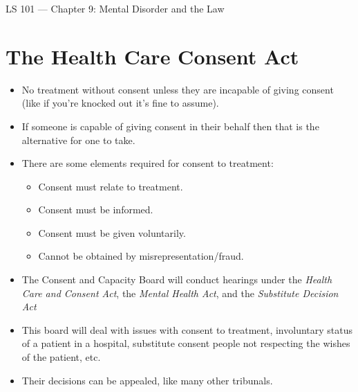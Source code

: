 \documentclass{article}
\author{Clement Tsang}
\begin{document}
\begin{center}
    \Large{LS 101 --- Chapter 9: Mental Disorder and the Law} 
\end{center}

\section{The Health Care Consent Act}
\begin{itemize}
    \item No treatment without consent unless they are incapable of giving consent (like if you're knocked out it's fine to assume).
    \item If someone is capable of giving consent in their behalf then that is the alternative for one to take.
    \item There are some elements required for consent to treatment:
        \begin{itemize}
            \item Consent must relate to treatment.
            \item Consent must be informed.
            \item Consent must be given voluntarily.
            \item Cannot be obtained by misrepresentation/fraud.
        \end{itemize}
    \item The Consent and Capacity Board will conduct hearings under the \emph{Health Care and Consent Act}, the \emph{Mental Health Act}, and the \emph{Substitute Decision Act}
    \item This board will deal with issues with consent to treatment, involuntary status of a patient in a hospital, substitute consent people not respecting the wishes of the patient, etc.
    \item Their decisions can be appealed, like many other tribunals.
\end{itemize}
\end{document}
